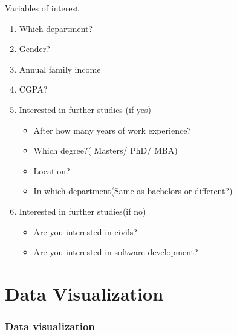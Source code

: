 \documentclass{beamer}
\begin{document}
\begin{frame}
    \begin{block}{Variables of interest}
        \begin{enumerate}
            \item Which department?
            \item Gender?
            \item Annual family income
            \item CGPA?
            \item Interested in further studies (if yes)
                  \begin{itemize}
                      \item After how many years of work experience?
                      \item Which degree?( Masters/ PhD/ MBA)
                      \item Location?
                      \item In which department(Same as bachelors or
                            different?)
                  \end{itemize}
            \item Interested in further studies(if no)
                  \begin{itemize}
                      \item Are you interested in civils?
                      \item Are you interested in software development?
                  \end{itemize}
        \end{enumerate}
    \end{block}
\end{frame}

\section{Data Visualization}
\begin{frame}
    \frametitle{Data visualization}

\end{frame}
\end{document}
